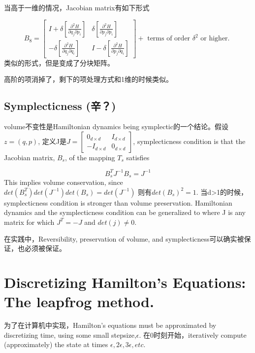 \documentclass[
]{book}
\theoremstyle{definition}
\theoremstyle{definition}
\theoremstyle{definition}
\theoremstyle{remark}
\begin{document}
当高于一维的情况，Jacobian matrix有如下形式

\[
B_{8}=\left[ \begin{array}{c}{I+\delta\left[\frac{\partial^{2} H}{\partial q_{j} \partial p_{i}}\right]} & {\delta\left[\frac{\partial^{2} H}{\partial p_{j} \partial p_{i}}\right]} \\ {-\delta\left[\frac{\partial^{2} H}{\partial q_{j} \partial q_{i}}\right]} & {I-\delta\left[\frac{\partial^{2} H}{\partial p_{j} \partial q_{i}}\right]}\end{array}\right]+\text { terms of order } \delta^{2} \text { or higher. }
\]
类似的形式，但是变成了分块矩阵。

高阶的项消掉了，剩下的项处理方式和1维的时候类似。

\hypertarget{symplecticness-ux8f9b}{%
\subsection{Symplecticness (辛？)}\label{symplecticness-ux8f9b}}

volume不变性是Hamiltonian dynamics being symplectic的一个结论。假设\(z=(q,p)\), 定义J是\(J=\left[ \begin{array}{cc}{0_{d \times d}} & {I_{d \times d}} \\ {-I_{d \times d}} & {0_{d \times d}}\end{array}\right]\), symplecticness condition is that the Jacobian matrix, \(B_s\), of the mapping \(T_s\) satisfies

\[
B_{s}^{T} J^{-1} B_{s}=J^{-1}
\]
This implies volume conservation, since \(det(B^T_s)det(J^{-1})det(B_s)=det(J^{-1})\) 则有\(det(B_s)^2=1\). 当d\textgreater1的时候，symplecticness condition is stronger than volume preservation. Hamiltonian dynamics and the symplecticness condition can be generalized to where J is any matrix for which \(J^T=-J\) and \(det(j)\neq 0\).

在实践中，Reversibility, preservation of volume, and symplecticness可以确实被保证，也必须被保证。

\hypertarget{discretizing-hamiltons-equations-the-leapfrog-method.}{%
\section{Discretizing Hamilton's Equations: The leapfrog method.}\label{discretizing-hamiltons-equations-the-leapfrog-method.}}

为了在计算机中实现，Hamilton's equations must be approximated by discretizing time, using some small stepsize,\(\epsilon\). 在0时刻开始，iteratively compute (approximately) the state at times \(\epsilon,2\epsilon,3\epsilon,etc.\)
\end{document}
